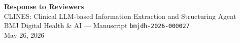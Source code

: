 \documentclass[12pt,nopreprintline]{elsarticle}
\begin{document}

\clearpage

\begingroup
\begin{center}
{\Large\bfseries Response to Reviewers}\\[0.4em]
{\large CLINES: Clinical LLM-based Information Extraction and Structuring Agent}\\[0.2em]
{\normalsize BMJ Digital Health \& AI --- Manuscript \texttt{bmjdh-2026-000027}}\\[0.6em]
{\small May 26, 2026}
\end{center}
\vspace{1em}
\setcounter{section}{0}
\renewcommand{\theHsection}{resp.\arabic{section}}
\renewcommand{\theHsubsection}{resp.\arabic{section}.\arabic{subsection}}
\renewcommand{\theHsubsubsection}{resp.\arabic{section}.\arabic{subsection}.\arabic{subsubsection}}

\endgroup
\clearpage

\setcounter{section}{0}
\setcounter{figure}{0}
\setcounter{table}{0}
\renewcommand{\theHsection}{ms.\arabic{section}}
\renewcommand{\theHsubsection}{ms.\arabic{section}.\arabic{subsection}}
\renewcommand{\theHsubsubsection}{ms.\arabic{section}.\arabic{subsection}.\arabic{subsubsection}}
\renewcommand{\theHfigure}{ms.\arabic{figure}}
\renewcommand{\theHtable}{ms.\arabic{table}}
\end{document}
